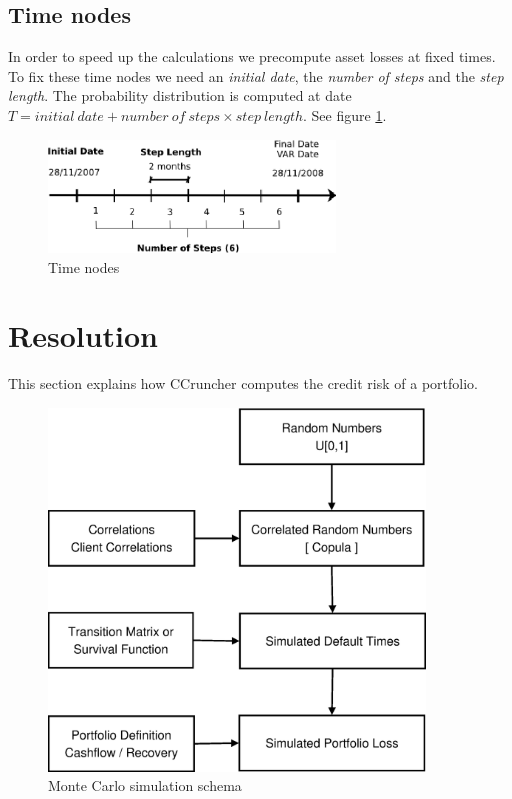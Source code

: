 \documentclass[a4paper,12pt,final]{article}
\begin{document}
\subsection{Time nodes}
In order to speed up the calculations we precompute asset losses at fixed 
times. To fix these time nodes we need an \emph{initial date}, the 
\emph{number of steps} and the \emph{step length}. The probability distribution
is computed at date $T = initial\ date + number\ of\ steps \times step\ length$.
See figure \ref{cctime1}.

\begin{figure}[!hbt]
\begin{center}
\includegraphics[height=3.0cm, angle=0]{./images/cctime1.eps}
\caption{Time nodes}
\label{cctime1}
\end{center}
\end{figure}
\FloatBarrier


\clearpage
\section{Resolution}

This section explains how CCruncher computes the credit risk of a portfolio.

\begin{figure}[!hb]
\begin{center}
\includegraphics[width=10cm,angle=0]{./images/esquema1.eps}
\caption{Monte Carlo simulation schema}
\label{fig:mcschema1}
\end{center}
\end{figure}
\end{document}
